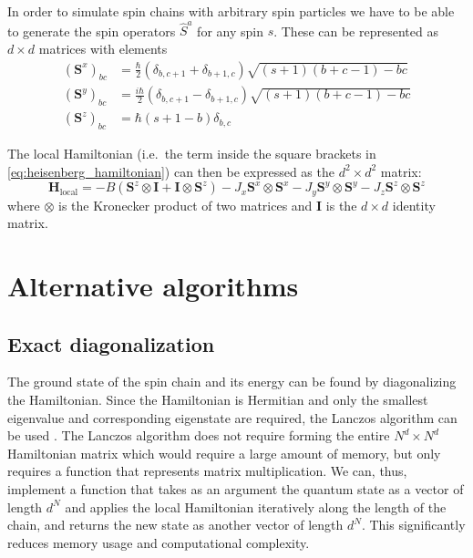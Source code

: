 \documentclass[a4paper, headsepline, footheight=13.6pt]{scrartcl}
\begin{document}
In order to simulate spin chains with arbitrary spin particles we have to be able to generate the spin operators $\hat{S}^a$ for any spin $s$. These can be represented as {$d \times d$} matrices with elements
\begin{align}
    \left(\mathbf{S}^x\right)_{bc} &= \frac{\hbar}{2}  \left(\delta_{b,c+1} + \delta_{b+1,c}\right) \sqrt{(s + 1)(b + c - 1) - bc} \\
    \left(\mathbf{S}^y\right)_{bc} &= \frac{i\hbar}{2} \left(\delta_{b,c+1} - \delta_{b+1,c}\right) \sqrt{(s + 1)(b + c - 1) - bc} \\
    \left(\mathbf{S}^z\right)_{bc} &= \hbar (s + 1 - b) \delta_{b,c}
\end{align}

The local Hamiltonian (i.e.\ the term inside the square brackets in \autoref{eq:heisenberg_hamiltonian}) can then be expressed as the {$d^2 \times d^2$} matrix:
\begin{equation}
    \mathbf{H}_{\text{local}} =
    -B \left(\mathbf{S}^z \otimes \mathbf{I} +
    \mathbf{I} \otimes \mathbf{S}^z\right) -
    J_x \mathbf{S}^x \otimes \mathbf{S}^x -
    J_y \mathbf{S}^y \otimes \mathbf{S}^y -
    J_z \mathbf{S}^z \otimes \mathbf{S}^z
\end{equation}
where $\otimes$ is the Kronecker product of two matrices and $\mathbf{I}$ is the {$d \times d$} identity matrix.

\section{Alternative algorithms}
\subsection{Exact diagonalization}
The ground state of the spin chain and its energy can be found by diagonalizing the Hamiltonian. Since the Hamiltonian is Hermitian and only the smallest eigenvalue and corresponding eigenstate are required, the Lanczos algorithm can be used \cite{lanczos:1950}. The Lanczos algorithm does not require forming the entire {$N^d \times N^d$} Hamiltonian matrix which would require a large amount of memory, but only requires a function that represents matrix multiplication. We can, thus, implement a function that takes as an argument the quantum state as a vector of length $d^N$ and applies the local Hamiltonian iteratively along the length of the chain, and returns the new state as another vector of length $d^N$. This significantly reduces memory usage and computational complexity.
\end{document}
